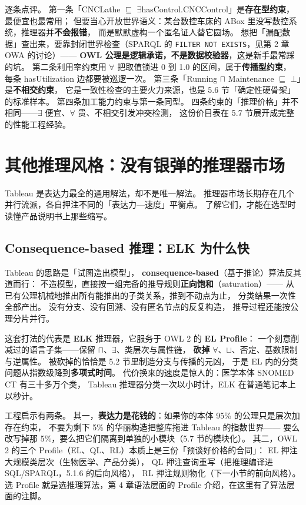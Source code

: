 

逐条点评。
第一条「CNCLathe \(\sqsubseteq\) \(\exists\)hasControl.CNCControl」是\textbf{存在型约束}，最便宜也最常用；
但要当心开放世界语义：某台数控车床的 ABox 里没写数控系统，推理器并\textbf{不会报错}，
而是默默虚构一个匿名证人替它圆场。
想把「漏配数据」查出来，要靠封闭世界检查（SPARQL 的 \texttt{FILTER NOT EXISTS}，见第 2 章 OWA 的讨论）——
\textbf{OWL 公理是逻辑承诺，不是数据校验器}，这是新手最常踩的坑。
第二条利用率约束用 \(\forall\) 把取值锁进 0 到 1.0 的区间，属于\textbf{传播型约束}，
每条 hasUtilization 边都要被巡逻一次。
第三条「Running \(\sqcap\) Maintenance \(\sqsubseteq\) \(\bot\)」是\textbf{不相交约束}，
它是一致性检查的主要火力来源，也是 5.6 节「确定性硬骨架」的标准样本。
第四条加工能力约束与第一条同型。
四条约束的「推理价格」并不相同——\(\exists\) 便宜、\(\forall\) 贵、不相交引发冲突检测，
这份价目表在 5.7 节展开成完整的性能工程经验。

\section{其他推理风格：没有银弹的推理器市场}

Tableau 是表达力最全的通用解法，却不是唯一解法。
推理器市场长期存在几个并行流派，各自押注不同的「表达力—速度」平衡点。
了解它们，才能在选型时读懂产品说明书上那些缩写。

\subsection{Consequence-based 推理：ELK 为什么快}

Tableau 的思路是「试图造出模型」，
\textbf{consequence-based}（基于推论）算法反其道而行：
不造模型，直接按一组完备的推导规则\textbf{正向饱和}（saturation）——
从已有公理机械地推出所有能推出的子类关系，推到不动点为止，
分类结果一次性全部产出。
没有分支、没有回溯、没有匿名节点的反复构造，
推导过程还能按公理分片并行。

这套打法的代表是 \textbf{ELK} 推理器，它服务于 OWL 2 的 \textbf{EL Profile}：
一个刻意削减过的语言子集——保留 \(\sqcap\)、\(\exists\)、类层次与属性链，
\textbf{砍掉} \(\forall\)、\(\sqcup\)、否定、基数限制与逆属性。
被砍掉的恰恰是 5.2 节里制造分支与传播的元凶，
于是 EL 内的分类问题从指数级降到\textbf{多项式时间}。
代价换来的速度是惊人的：医学本体 SNOMED CT 有三十多万个类，
Tableau 推理器分类一次以小时计，ELK 在普通笔记本上以秒计。

工程启示有两条。
其一，\textbf{表达力是花钱的}：如果你的本体 95\% 的公理只是层次加存在约束，
不要为剩下 5\% 的华丽构造把整库拖进 Tableau 的指数世界——
要么改写掉那 5\%，要么把它们隔离到单独的小模块（5.7 节的模块化）。
其二，OWL 2 的三个 Profile（EL、QL、RL）本质上是三份「预谈好价格的合同」：
EL 押注大规模类层次（生物医学、产品分类），
QL 押注查询重写（把推理编译进 SQL/SPARQL，5.1.6 的后向风格），
RL 押注规则物化（下一小节的前向风格）。
选 Profile 就是选推理算法，第 4 章语法层面的 Profile 介绍，在这里有了算法层面的注脚。

